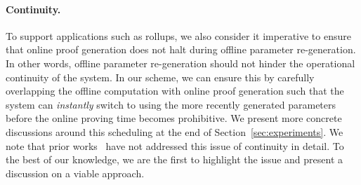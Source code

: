 \paragraph{\bf Continuity.} To support applications such as rollups, we also consider it imperative to ensure that online proof generation does not halt during offline parameter re-generation. In other words, offline parameter re-generation should not hinder the operational continuity of the system. In our scheme, we can ensure this by carefully overlapping the offline computation with online proof generation such that the system can \textit{instantly} switch to using the more recently generated parameters before the online proving time becomes prohibitive. We present more concrete discussions around this scheduling at the end of Section~\ref{sec:experiments}. We note that prior works~\cite{USENIX:OWWB20,CCS:CFHKKO22} have not addressed this issue of continuity in detail. To the best of our knowledge, we are the first to highlight the issue and present a discussion on a viable approach.

%








